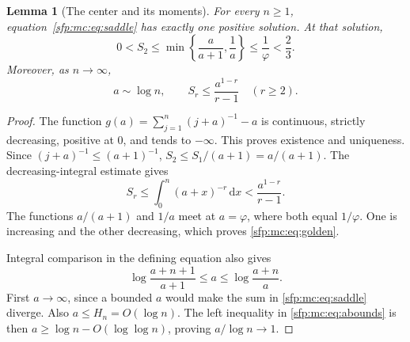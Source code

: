 \documentclass[11pt,letterpaper]{article}
\numberwithin{equation}{section}
\newtheorem{lemma}[theorem]{Lemma}
\theoremstyle{definition}\newtheorem{definition}[theorem]{Definition}
\theoremstyle{remark}\newtheorem{remark}[theorem]{Remark}
\newcommand{\dd}{\,\mathrm d}
\begin{document}
\begin{lemma}[The center and its moments]\label{sfp:mc:lem:saddle}
For every $n\geq1$, equation~\eqref{sfp:mc:eq:saddle} has exactly one
positive solution. At that solution,
\begin{equation}\label{sfp:mc:eq:golden}
 0<S_2\leq\min\left\{\frac{a}{a+1},\frac1a\right\}
 \leq\frac1\varphi<\frac23.
\end{equation}
Moreover, as $n\to\infty$,
\begin{equation}\label{sfp:mc:eq:momentorders}
 a\sim\log n,\qquad S_r\leq\frac{a^{1-r}}{r-1}\quad(r\geq2).
\end{equation}
\end{lemma}
\begin{proof}
The function $g(a)=\sum_{j=1}^{n}(j+a)^{-1}-a$ is continuous,
strictly decreasing, positive at $0$, and tends to $-\infty$.
This proves existence and uniqueness. Since
$(j+a)^{-1}\leq(a+1)^{-1}$,
$S_2\leq S_1/(a+1)=a/(a+1)$.
The decreasing-integral estimate gives
\[
 S_r\leq\int_0^n(a+x)^{-r}\dd x
 <\frac{a^{1-r}}{r-1}.
\]
The functions $a/(a+1)$ and $1/a$ meet at $a=\varphi$,
where both equal $1/\varphi$. One is increasing and the other
decreasing, which proves \eqref{sfp:mc:eq:golden}.

Integral comparison in the defining equation also gives
\begin{equation}\label{sfp:mc:eq:abounds}
 \log\frac{a+n+1}{a+1}\leq a\leq\log\frac{a+n}{a}.
\end{equation}
First $a\to\infty$, since a bounded $a$ would make the sum in
\eqref{sfp:mc:eq:saddle} diverge. Also $a\leq H_n=O(\log n)$.
The left inequality in \eqref{sfp:mc:eq:abounds} is then
$a\geq\log n-O(\log\log n)$, proving $a/\log n\to1$.
\end{proof}
\end{document}
